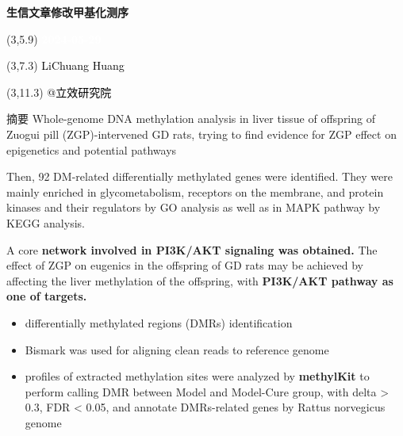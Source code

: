 \documentclass[
  ignorenonframetext,
]{beamer}
\author{}
\date{\vspace{-2.5em}}
\providecommand{\tightlist}{%
  \setlength{\itemsep}{0pt}\setlength{\parskip}{0pt}}
\begin{document}
\begin{frame}
\begin{titlepage} 
\begin{center} \textbf{\Huge
生信文章修改甲基化测序} \vspace{4em}
\begin{textblock}{10}(3,5.9) \huge
\textbf{\textcolor{white}{2024-05-29}}
\end{textblock} \begin{textblock}{10}(3,7.3)
\Large \textcolor{black}{LiChuang Huang}
\end{textblock} \begin{textblock}{10}(3,11.3)
\Large \textcolor{black}{@立效研究院}
\end{textblock} \end{center} \end{titlepage}
\restoregeometry


\tableofcontents

\listoffigures

\listoftables



\end{frame}

\begin{frame}{摘要}
\protect\hypertarget{abstract}{}
Whole-genome DNA methylation analysis in liver tissue of offspring of
Zuogui pill (ZGP)-intervened GD rats, trying to find evidence for ZGP
effect on epigenetics and potential pathways

Then, 92 DM-related differentially methylated genes were identified.
They were mainly enriched in glycometabolism, receptors on the membrane,
and protein kinases and their regulators by GO analysis as well as in
MAPK pathway by KEGG analysis.

A core \textbf{network involved in PI3K/AKT signaling was obtained.} The
effect of ZGP on eugenics in the offspring of GD rats may be achieved by
affecting the liver methylation of the offspring, with \textbf{PI3K/AKT
pathway as one of targets.}

\begin{itemize}
\tightlist
\item
  differentially methylated regions (DMRs) identification
\item
  Bismark was used for aligning clean reads to reference genome
\item
  profiles of extracted methylation sites were analyzed by
  \textbf{methylKit} to perform calling DMR between Model and Model-Cure
  group, with \textbar delta\textbar{} \textgreater{} 0.3, FDR
  \textless{} 0.05, and annotate DMRs-related genes by Rattus norvegicus
  genome
\end{itemize}
\end{frame}
\end{document}
